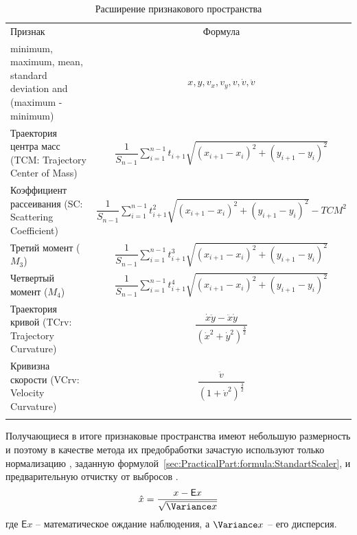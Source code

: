 \documentclass[12pt]{article}
\begin{document}
    \begin{table}[h]
        \centering
        \renewcommand{\arraystretch}{1.5}
        \renewcommand{\tabcolsep}{2mm}
        \caption{Расширение признакового пространства}
        \begin{tabular}{ || m{60mm} | c ||}
            \hhline{|t:==:t|} 
            Признак & Формула \\ [2mm]
            \hhline{|:==:|}
            minimum, maximum, mean, standard deviation and (maximum - minimum) & $x, y, v_x, v_y, v, \dot{v}, \ddot{v}$ \\
            \hhline{||-|-||}
            Траектория центра масс (TCM: Trajectory Center of Mass) & $ \dfrac{1}{S_{n-1}} \sum_{i=1}^{n-1} t_{i+1} \sqrt{(x_{i+1} - x_{i})^2 + (y_{i+1} - y_i)^2} $ \\
            \hhline{||-|-||}
            Коэффициент рассеивания (SC: Scattering Coefficient) &  $ \dfrac{1}{S_{n-1}} \sum_{i=1}^{n-1} t_{i+1}^2 \sqrt{(x_{i+1} - x_{i})^2 + (y_{i+1} - y_i)^2} - TCM^2 $ \\
            \hhline{||-|-||}
            Третий момент ($M_3$) & $ \dfrac{1}{S_{n-1}} \sum_{i=1}^{n-1} t_{i+1}^3 \sqrt{(x_{i+1} - x_{i})^2 + (y_{i+1} - y_i)^2} $ \\
            \hhline{||-|-||}
            Четвертый момент ($M_4$) & $ \dfrac{1}{S_{n-1}} \sum_{i=1}^{n-1} t_{i+1}^4 \sqrt{(x_{i+1} - x_{i})^2 + (y_{i+1} - y_i)^2} $ \\
            \hhline{||-|-||}
            Траектория кривой (TCrv: Trajectory Curvature) & $ \dfrac{\dot{x}\ddot{y} - \ddot{x}\dot{y}}{(\dot{x}^2 + \dot{y}^2)^\tfrac{3}{2}} $ \\
            \hhline{||-|-||}
            Кривизна скорости (VCrv: Velocity Curvature) & $ \dfrac{\ddot{v}}{(1 + \dot{v}^2)^\tfrac{3}{2}} $ \\
            \hhline{|b:==:b|}
        \end{tabular}
        \label{sec:Overview:Features:table:ArsFeaturesFormulas}
    \end{table}

    \par Получающиеся в итоге признаковые пространства имеют небольшую размерность и поэтому в качестве метода их предобработки зачастую используют только нормализацию \cite{Fridman, Kasprowski, Tan}, заданную формулой~\ref{sec:PracticalPart:formula:StandartScaler}, и предварительную отчистку от выбросов \cite{Tan, Pilankar}.
    \begin{equation}
    \label{sec:PracticalPart:formula:StandartScaler}
        \hat{x}  = \frac{x - \mathsf{E} x}{\sqrt{\Variance x}}
    \end{equation}
    \noindent где $\mathsf{E} x$ -- математическое ождание наблюдения, а $\Variance x$ -- его дисперсия. 
\end{document}
